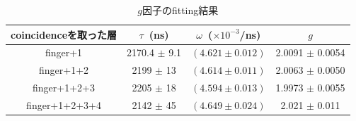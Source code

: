   \begin{table}[H]
   \caption{$g$因子のfitting結果}
   \label{fit_g}
   \begin{center}
    \begin{tabular}{cccc}\toprule
     coincidenceを取った層&$\tau$~(ns)& $\omega$~($\times 10^{-3}$/ns) & $g$ \\ \midrule
     finger+1             &2170.4 $\pm$ 9.1 & $( 4.621 \pm 0.012 ) $ & 2.0091 $\pm$ 0.0054 \\
     finger+1+2 	  &2199 $\pm$ 13    & $( 4.614 \pm 0.011 ) $ & 2.0063 $\pm$ 0.0050 \\
     finger+1+2+3 	  &2205 $\pm$ 18    & $( 4.594 \pm 0.013 ) $ & 1.9973 $\pm$ 0.0055\\
     finger+1+2+3+4 	  &2142 $\pm$ 45    & $( 4.649 \pm 0.024 ) $ & 2.021 $\pm$ 0.011 \\ \bottomrule
    \end{tabular}
   \end{center}
  \end{table}%


